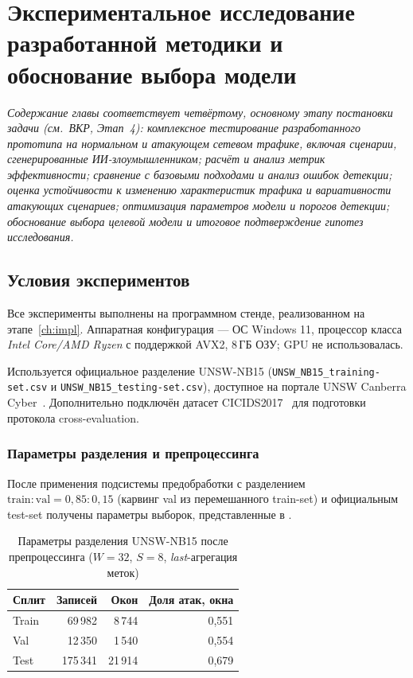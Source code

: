 \section{Экспериментальное исследование разработанной методики и обоснование выбора модели}
\label{ch:experiments}

\noindent
\textit{Содержание главы соответствует четвёртому, основному этапу
постановки задачи (см.~ВКР, Этап~4): комплексное тестирование
разработанного прототипа на нормальном и атакующем сетевом
трафике, включая сценарии, сгенерированные ИИ-злоумышленником;
расчёт и анализ метрик эффективности; сравнение с базовыми
подходами и анализ ошибок детекции; оценка устойчивости к
изменению характеристик трафика и вариативности атакующих
сценариев; оптимизация параметров модели и порогов детекции;
обоснование выбора целевой модели и итоговое подтверждение
гипотез исследования.}\\

\subsection{Условия экспериментов}

Все эксперименты выполнены на программном стенде, реализованном на
этапе~\ref{ch:impl}. Аппаратная конфигурация --- ОС Windows 11,
процессор класса \emph{Intel Core/AMD Ryzen} с поддержкой AVX2,
8\,ГБ ОЗУ; GPU не использовалась.

Используется официальное разделение UNSW-NB15
(\verb|UNSW_NB15_training-set.csv| и \verb|UNSW_NB15_testing-set.csv|),
доступное на портале UNSW Canberra Cyber~\cite{moustafa2015unsw, unswportal}.
Дополнительно подключён датасет CICIDS2017~\cite{sharafaldin2018toward}
для подготовки протокола cross-evaluation.

\subsubsection{Параметры разделения и препроцессинга}

После применения подсистемы предобработки с разделением
\(\text{train} : \text{val} = 0{,}85 : 0{,}15\) (карвинг val
из перемешанного train-set) и официальным test-set получены
параметры выборок, представленные в .

\begin{table}[H]
\centering
\caption{Параметры разделения UNSW-NB15 после препроцессинга
(\(W = 32\), \(S = 8\), \emph{last}-агрегация меток)}
\label{tab:dataset-stats}
\renewcommand{\arraystretch}{1.2}
\begin{tabular}{lrrr}
\toprule
\textbf{Сплит} & \textbf{Записей} & \textbf{Окон} & \textbf{Доля атак, окна} \\
\midrule
Train & 69\,982   & 8\,744   & 0{,}551 \\
Val   & 12\,350   & 1\,540   & 0{,}554 \\
Test  & 175\,341  & 21\,914  & 0{,}679 \\
\bottomrule
\end{tabular}
\end{table}

